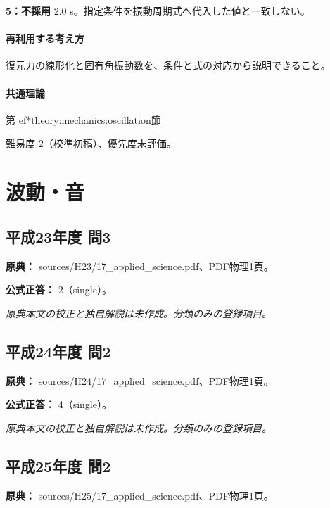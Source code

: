 \noindent\textbf{5：不採用} 2.0 s。指定条件を振動周期式へ代入した値と一致しない。\par

\paragraph{再利用する考え方} 復元力の線形化と固有角振動数を、条件と式の対応から説明できること。

\paragraph{共通理論} \hyperref[theory:mechanics:oscillation]{第
ef*{theory:mechanics:oscillation}節}

\par 難易度 2（校準初稿）、優先度未評価。

\section{波動・音}

\subsection{平成23年度 問3}
\label{q:h23-reg-applied-03}

\noindent\textbf{原典：} sources/H23/17\_applied\_science.pdf、PDF物理1頁。

\textbf{公式正答：} 2（single）。

\par\textit{原典本文の校正と独自解説は未作成。分類のみの登録項目。}

\subsection{平成24年度 問2}
\label{q:h24-reg-applied-02}

\noindent\textbf{原典：} sources/H24/17\_applied\_science.pdf、PDF物理1頁。

\textbf{公式正答：} 4（single）。

\par\textit{原典本文の校正と独自解説は未作成。分類のみの登録項目。}

\subsection{平成25年度 問2}
\label{q:h25-reg-applied-02}

\noindent\textbf{原典：} sources/H25/17\_applied\_science.pdf、PDF物理1頁。

